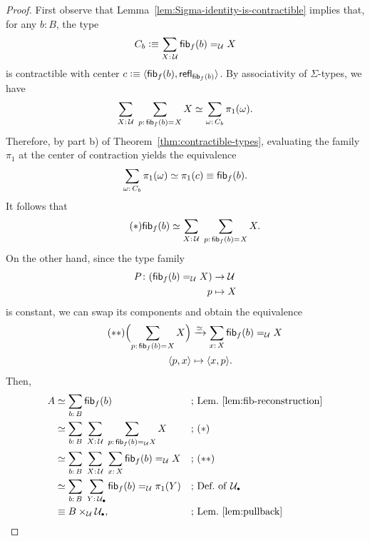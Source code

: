 \begin{proof}
    First observe that Lemma~\ref{lem:Sigma-identity-is-contractible} implies that, for any\/ $b\colon B$, the type
    \[
        C_b\defeq\sum_{X\colon\univ}\fun{fib}_f(b)\eq{\univ}X
    \]
    is contractible with center\/ $c\mathrel{\vcentcolon}\equiv\langle\mathsf{fib}_f(b),\mathsf{refl}_{\mathsf{fib}_f(b)}\rangle$. By associativity of\/ $\Sigma$-types, we have
    \[
        \sum_{X\colon\univ}\;
        \sum_{p\colon\fun{fib}_f(b)\eq{}X}X
        \simeq\sum_{\omega\colon C_b}\pi_1(\omega).
    \]
    Therefore, by part b) of Theorem~\ref{thm:contractible-types}, evaluating the family\/ $\pi_1$ at the center of contraction yields the equivalence
    \begin{align*}
        \sum_{\omega\colon C_b}\pi_1(\omega)
            \simeq\pi_1(c)\equiv\fun{fib}_f(b).
    \end{align*}
    It follows that
    \[\tag{$*$}
        \fun{fib}_f(b)\simeq
            \sum_{X\colon\univ}\;
            \sum_{p\colon\fun{fib}_f(b)\eq{}X}X.
    \]
    On the other hand, since the type family
    \begin{align*}
        P\colon(\fun{fib}_f(b)\eq{\univ}X)&\to\univ\\
        p&\mapsto X   
    \end{align*}
    is constant, we can swap its components and obtain the equivalence
    \begin{align*}\tag{$**$}
        \Bigl(\sum_{p\colon\fun{fib}_f(b)\eq{}X}X\Bigr)
        &\xto{\simeq}\sum_{x\colon X}\fun{fib}_f(b)\eq{\univ}X\\
        \dep{p,x}&\mapsto\dep{x,p}.
    \end{align*}
    Then,
    \begin{align*}
        A
            &\simeq\sum_{b\colon B}\fun{fib}_f(b)
                &&\text{; Lem.~\ref{lem:fib-reconstruction}}\\
        &\simeq
            \sum_{b\colon B}\;
            \sum_{X\colon\univ}\;
            \sum_{p\colon\fun{fib}_f(b)\eq{\univ}X}X
            &&\text{; ($*$)}\\
        &\simeq
            \sum_{b\colon B}\;
            \sum_{X\colon\univ}\;
            \sum_{x\colon X}\fun{fib}_f(b)\eq{\univ}X
            &&\text{; ($**$)}\\
        &\simeq
            \sum_{b\colon B}\;
            \sum_{Y\colon\puniv}\fun{fib}_f(b)\eq{\univ}\pi_1(Y)
            &&\text{; Def.~of\/ }\puniv\\
        &\equiv B\times_{\univ}\puniv,
            &&\text{; Lem.~\ref{lem:pullback}}

\end{align*}
\end{proof}
